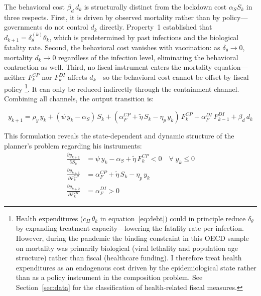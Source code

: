 \documentclass[12pt, a4paper]{article}
\begin{document}
\noindent The behavioral cost $\beta_d\, d_k$ is structurally distinct from the lockdown cost $\alpha_S S_k$ in three respects. First, it is driven by observed mortality rather than by policy---governments do not control $d_k$ directly. Property~1 established that $d_{k+1} = \delta_\theta^{(k)} \theta_k$, which is predetermined by past infections and the biological fatality rate. Second, the behavioral cost vanishes with vaccination: as $\delta_\theta \to 0$, mortality $d_k \to 0$ regardless of the infection level, eliminating the behavioral contraction as well. Third, no fiscal instrument enters the mortality equation---neither $F^{CP}_k$ nor $F^{DI}_k$ affects $d_k$---so the behavioral cost cannot be offset by fiscal policy \footnote{Health expenditures ($c_H\,\theta_k$ in 
equation~\ref{eq:debt}) could in principle reduce $\delta_\theta$ 
by expanding treatment capacity---lowering the fatality rate per 
infection. However, during the pandemic the binding constraint in this OECD sample on mortality was primarily biological (viral lethality and population 
age structure) rather than fiscal (healthcare funding). I therefore 
treat health expenditures as an endogenous cost driven by the 
epidemiological state rather than as a policy instrument in the 
composition problem. See Section~\ref{sec:data} for the 
classification of health-related fiscal measures.}. It can only be reduced indirectly through the containment channel. Combining all channels, the output transition is:


%
\begin{equation}{
    y_{k+1} = \rho_y\, y_k + (\psi\, y_k - \alpha_S)\, S_k + (\alpha^{CP}_F + \tilde{\eta}\, S_k - \eta_p\, y_k)\, F^{CP}_k + \alpha^{DI}_F\,F^{DI}_{k-1} + \beta_d\, d_k
}
\label{eq:output}
\end{equation}
%

\noindent This formulation reveals the state-dependent and dynamic structure of the planner's problem regarding his instruments:
%
\begin{align}
    \frac{\partial y_{k+1}}{\partial S_k} &= \psi\, y_k - \alpha_S + \tilde{\eta}\, F^{CP}_k < 0 \quad \forall\; y_k \leq 0
    \label{eq:marginal_S} \\[6pt]
    \frac{\partial y_{k+1}}{\partial F^{CP}_k} &= \alpha^{CP}_F + \tilde{\eta}\, S_k - \eta_p\, y_k
    \label{eq:marginal_CP} \\[6pt]
    \frac{\partial y_{k+2}}{\partial F^{DI}_k} &= \alpha^{DI}_F > 0
    \label{eq:marginal_DI}
\end{align}
\end{document}
